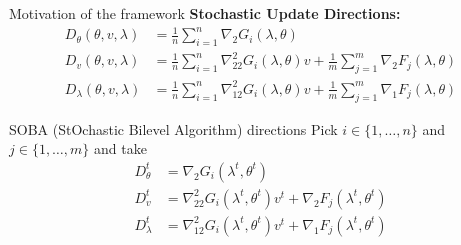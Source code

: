 \documentclass{beamer}
\begin{document}
\begin{frame}{Motivation of the framework}
\textbf{Stochastic Update Directions: }
    \begin{align*}
        D_\theta(\theta, v, \lambda) &= \frac1n\sum_{i=1}^n\nabla_2 G_i(\lambda, \theta) \\
        D_v(\theta, v, \lambda) &= \frac1n\sum_{i=1}^n\nabla^2_{22} G_i(\lambda, \theta)v + \frac1m\sum_{j=1}^m\nabla_2 F_j(\lambda, \theta) \\
        D_\lambda(\theta, v, \lambda) &= \frac1n\sum_{i=1}^n\nabla^2_{12} G_i(\lambda, \theta)v + \frac1m\sum_{j=1}^m\nabla_1 F_j(\lambda, \theta)
    \end{align*}


\end{frame}



\begin{frame}{SOBA (StOchastic Bilevel Algorithm) directions}
    Pick $i\in\{1,\dots,n\}$ and $j\in\{1,\dots,m\}$ and take
    \vspace{.5cm}
    \begin{align*}
        D_\theta^t &= \nabla_2 G_i(\lambda^t, \theta^t) \\
        D_v^t &= \nabla^2_{22} G_i(\lambda^t, \theta^t)v^t + \nabla_2 F_j(\lambda^t, \theta^t) \\
        D_\lambda^t &= \nabla^2_{12} G_i(\lambda^t, \theta^t)v^t + \nabla_1 F_j(\lambda^t, \theta^t)
    \end{align*}
\end{frame}

\end{document}
